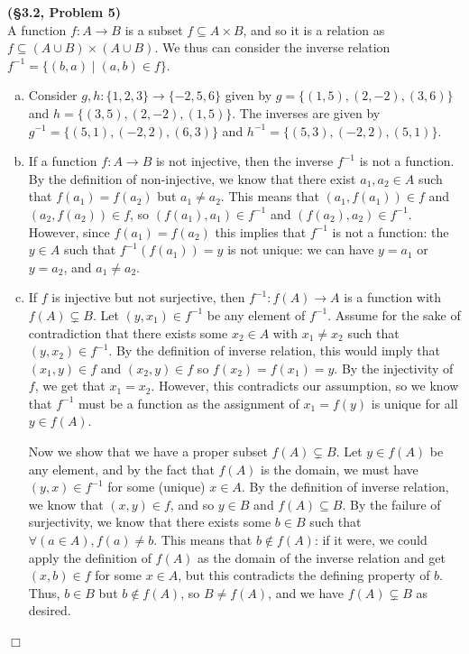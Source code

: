 \documentclass[12pt]{article}
\theoremstyle{definition}
\newenvironment{Solution}{\noindent {\sc Solution.}}{$\Box$ \vspace{2 ex}}
\begin{document}
\begin{Solution}
{\bf (\S3.2, Problem 5)}\\
A function $f : A \to B$ is a subset $f \subseteq A \times B$, and so it is a relation as $f \subseteq (A \cup B) \times (A \cup B)$. We thus can consider the inverse relation $f^{-1} = \{(b,a) \mid (a,b) \in f\}$.
\begin{enumerate}[(a)]
    \item Consider $g,h : \{1,2,3\} \to \{-2,5,6\}$ given by $g = \{(1,5),(2,-2),(3,6)\}$ and $h=\{(3,5),(2,-2),(1,5)\}$. The inverses are given by $g^{-1} = \{(5,1),(-2,2),(6, 3)\}$ and $h^{-1}=\{(5,3),(-2,2),(5,1)\}$.
    \item If a function $f : A\to B$ is not injective, then the inverse $f^{-1}$ is not a function. By the definition of non-injective, we know that there exist $a_1,a_2 \in A$ such that $f(a_1) = f(a_2)$ but $a_1 \ne a_2$. This means that $(a_1, f(a_1)) \in f$ and $(a_2, f(a_2)) \in f$, so $(f(a_1),a_1)\in f^{-1}$ and $(f(a_2),a_2) \in f^{-1}$. However, since $f(a_1) = f(a_2)$ this implies that $f^{-1}$ is not a function: the $y \in A$ such that $f^{-1}(f(a_1)) = y$ is not unique: we can have $y=a_1$ or $y=a_2$, and $a_1 \ne a_2$.
    \item If $f$ is injective but not surjective, then $f^{-1} : f(A) \to A$ is a function with $f(A) \subsetneq B$. Let $(y,x_1) \in f^{-1}$ be any element of $f^{-1}$. Assume for the sake of contradiction that there exists some $x_2 \in A$ with $x_1 \ne x_2$ such that $(y, x_2) \in f^{-1}$. By the definition of inverse relation, this would imply that $(x_1, y) \in f$ and $(x_2, y) \in f$ so $f(x_2)=f(x_1)=y$. By the injectivity of $f$, we get that $x_1 = x_2$. However, this contradicts our assumption, so we know that $f^{-1}$ must be a function as the assignment of $x_1 = f(y)$ is unique for all $y \in f(A)$. 

    Now we show that we have a proper subset $f(A) \subsetneq B$. Let $y\in f(A)$ be any element, and by the fact that $f(A)$ is the domain, we must have $(y, x) \in f^{-1}$ for some (unique) $x \in A$. By the definition of inverse relation, we know that $(x,y) \in f$, and so $y \in B$ and $f(A) \subseteq B$. By the failure of surjectivity, we know that there exists some $b \in B$ such that $\forall (a \in A), f(a) \ne b$. This means that $b \not\in f(A)$: if it were, we could apply the definition of $f(A)$ as the domain of the inverse relation and get $(x, b) \in f$ for some $x \in A$, but this contradicts the defining property of $b$. Thus, $b \in B$ but $b \not\in f(A)$, so $B \ne f(A)$, and we have $f(A) \subsetneq B$ as desired.
\end{enumerate}
\end{Solution}
\end{document}
